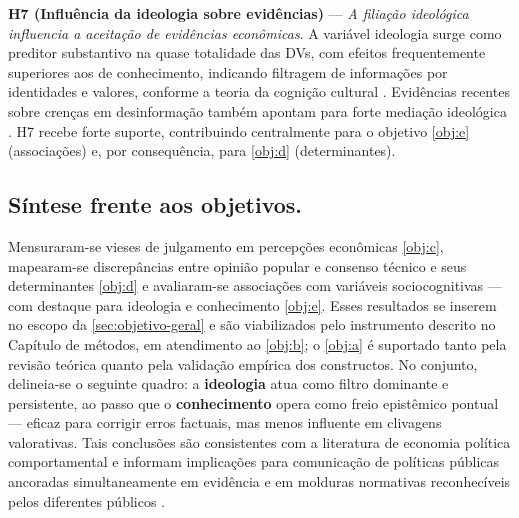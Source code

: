 \textbf{H7 (Influência da ideologia sobre evidências)} — \textit{A filiação ideológica influencia a aceitação de evidências econômicas}. A variável ideologia surge como preditor substantivo na quase totalidade das DVs, com efeitos frequentemente superiores aos de conhecimento, indicando filtragem de informações por identidades e valores, conforme a teoria da cognição cultural \cite{kahan2012polarization}. Evidências recentes sobre crenças em desinformação também apontam para forte mediação ideológica \cite{rossini2023explaining}. H7 recebe forte suporte, contribuindo centralmente para o objetivo \autoref{obj:e} (associações) e, por consequência, para \autoref{obj:d} (determinantes).

\subsection{Síntese frente aos objetivos.}
Mensuraram-se vieses de julgamento em percepções econômicas \autoref{obj:c}, mapearam-se discrepâncias entre opinião popular e consenso técnico e seus determinantes \autoref{obj:d} e avaliaram-se associações com variáveis sociocognitivas — com destaque para ideologia e conhecimento \autoref{obj:e}. Esses resultados se inserem no escopo da \autoref{sec:objetivo-geral} e são viabilizados pelo instrumento descrito no Capítulo de métodos, em atendimento ao \autoref{obj:b}; o \autoref{obj:a} é suportado tanto pela revisão teórica quanto pela validação empírica dos constructos. No conjunto, delineia-se o seguinte quadro: a \textbf{ideologia} atua como filtro dominante e persistente, ao passo que o \textbf{conhecimento} opera como freio epistêmico pontual — eficaz para corrigir erros factuais, mas menos influente em clivagens valorativas. Tais conclusões são consistentes com a literatura de economia política comportamental e informam implicações para comunicação de políticas públicas ancoradas simultaneamente em evidência e em molduras normativas reconhecíveis pelos diferentes públicos \cite{kahneman2011thinking, kahan2012polarization, Systematically_Biased_Beliefs_about_Economics}.
